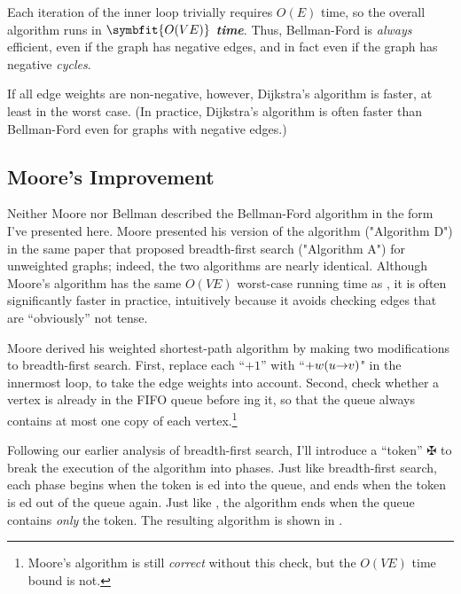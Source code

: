 Each iteration of the inner loop trivially requires $O(E)$ time, so the overall algorithm runs in \textbf{\textit{$\symbfit{O(VE)}$ time}}.
Thus, Bellman-Ford is \textit{always} efficient, even if the graph has negative edges, and in fact even if the graph has negative \textit{cycles}.

If all edge weights are non-negative, however, Dijkstra’s algorithm is faster, at least in the worst case.
(In practice, Dijkstra’s algorithm is often faster than Bellman-Ford even for graphs with negative edges.)

\subsection{Moore’s Improvement}

Neither Moore nor Bellman described the Bellman-Ford algorithm in the form I’ve presented here.
Moore presented his version of the algorithm ("Algorithm D") in the same paper that proposed breadth-first search ("Algorithm A") for unweighted graphs; indeed, the two algorithms are nearly identical.
Although Moore’s algorithm has the same $O(VE)$ worst-case running time as , it is often significantly faster in practice, intuitively because it avoids checking edges that are “obviously” not tense.

Moore derived his weighted shortest-path algorithm by making two modifications to breadth-first search.
First, replace each “$+1$” with “$+w(u\mathord{\rightarrow}v)$" in the innermost loop, to take the edge weights into account.
Second, check whether a vertex is already in the FIFO queue before ing it, so that the queue always contains at most one copy of each vertex.\footnote{Moore’s algorithm is still \textit{correct} without this check, but the $O(VE)$ time bound is not.}

Following our earlier analysis of breadth-first search, I’ll introduce a “token” $\maltese$ to break the execution of the algorithm into phases.
Just like breadth-first search, each phase begins when the token is ed into the queue, and ends when the token is ed out of the queue again.
Just like , the algorithm ends when the queue contains \textit{only} the token.
The resulting algorithm is shown in .

